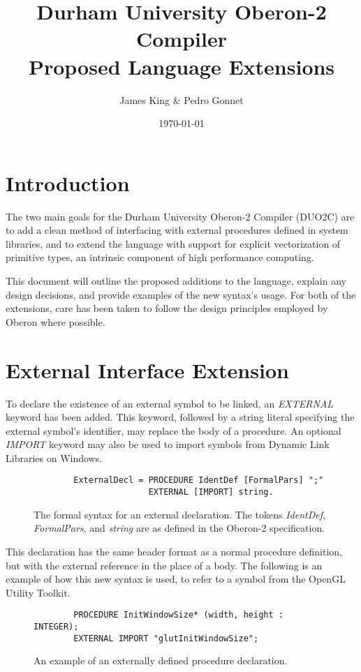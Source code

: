 \documentclass[a4paper,11pt]{article}
\title{\centering Durham University Oberon-2 Compiler \\ Proposed Language Extensions}
\date{\today}
\author{James King \& Pedro Gonnet}
\begin{document}
    \maketitle

    \section{Introduction}
    The two main goals for the Durham University Oberon-2 Compiler (DUO2C) are to add a clean method of interfacing with external procedures defined in system libraries, and to extend the language with support for explicit vectorization of primitive types, an intrinsic component of high performance computing.

    This document will outline the proposed additions to the language, explain any design decisions, and provide examples of the new syntax's usage. For both of the extensions, care has been taken to follow the design principles employed by Oberon where possible.

    \section{External Interface Extension}
    To declare the existence of an external symbol to be linked, an \emph{EXTERNAL} keyword has been added. This keyword, followed by a string literal specifying the external symbol's identifier, may replace the body of a procedure. An optional \emph{IMPORT} keyword may also be used to import symbols from Dynamic Link Libraries on Windows.

    \begin{figure}[h]
    \begin{lstlisting}
        ExternalDecl = PROCEDURE IdentDef [FormalPars] ";"
                       EXTERNAL [IMPORT] string.
    \end{lstlisting}
    \caption{The formal syntax for an external declaration. The tokens \emph{IdentDef}, \emph{FormalPars}, and \emph{string} are as defined in the Oberon-2 specification\cite{oberspec}.}
    \end{figure}

    \noindent
    This declaration has the same header format as a normal procedure definition, but with the external reference in the place of a body. The following is an example of how this new syntax is used, to refer to a symbol from the OpenGL Utility Toolkit\cite{glut}.

    \begin{figure}[h]
    \begin{lstlisting}
        PROCEDURE InitWindowSize* (width, height : INTEGER);
        EXTERNAL IMPORT "glutInitWindowSize";
    \end{lstlisting}
    \caption{An example of an externally defined procedure declaration.}
    \end{figure}
\end{document}
